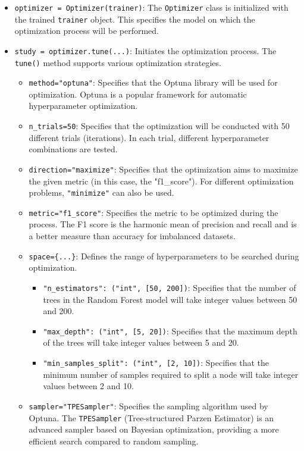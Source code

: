 \documentclass[conference]{IEEEtran}
\begin{document}
\begin{itemize}
    \item \texttt{optimizer = Optimizer(trainer)}: The \texttt{Optimizer} class is initialized with the trained \texttt{trainer} object. This specifies the model on which the optimization process will be performed.
    \item \texttt{study = optimizer.tune(...)}: Initiates the optimization process. The \texttt{tune()} method supports various optimization strategies.
    \begin{itemize}
        \item \texttt{method="optuna"}: Specifies that the Optuna library will be used for optimization. Optuna is a popular framework for automatic hyperparameter optimization.
        \item \texttt{n\_trials=50}: Specifies that the optimization will be conducted with 50 different trials (iterations). In each trial, different hyperparameter combinations are tested.
        \item \texttt{direction="maximize"}: Specifies that the optimization aims to maximize the given metric (in this case, the "f1\_score"). For different optimization problems, \texttt{"minimize"} can also be used.
        \item \texttt{metric="f1\_score"}: Specifies the metric to be optimized during the process. The F1 score is the harmonic mean of precision and recall and is a better measure than accuracy for imbalanced datasets.
        \item \texttt{space=\{...\}}: Defines the range of hyperparameters to be searched during optimization.
        \begin{itemize}
            \item \texttt{"n\_estimators": ("int", [50, 200])}: Specifies that the number of trees in the Random Forest model will take integer values between 50 and 200.
            \item \texttt{"max\_depth": ("int", [5, 20])}: Specifies that the maximum depth of the trees will take integer values between 5 and 20.
            \item \texttt{"min\_samples\_split": ("int", [2, 10])}: Specifies that the minimum number of samples required to split a node will take integer values between 2 and 10.
        \end{itemize}
        \item \texttt{sampler="TPESampler"}: Specifies the sampling algorithm used by Optuna. The \texttt{TPESampler} (Tree-structured Parzen Estimator) is an advanced sampler based on Bayesian optimization, providing a more efficient search compared to random sampling.

\end{itemize}
\end{itemize}
\end{document}
